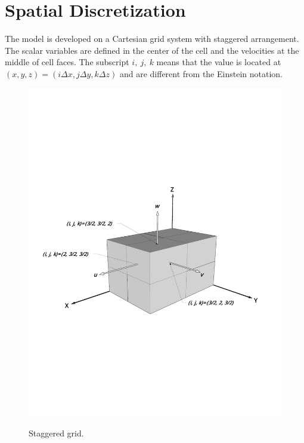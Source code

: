 \section{Spatial Discretization}
The model is developed on a Cartesian grid system with staggered
arrangement. The scalar variables are defined in the center of the
cell and the velocities at the middle of cell faces. The subscript
$i, \ j, \ k$ means that the value is located at $(x,y,z)=(  i
\Delta x, j \Delta y, k \Delta z )$ and are different from the Einstein notation.
\begin{figure}[h]
\hspace{0.4in}
\includegraphics[width=5.6in]{../figures/Staggered/Staggered3D.pdf}
\label{fig:Staggered3D}
\caption{Staggered grid.}
\end{figure}

